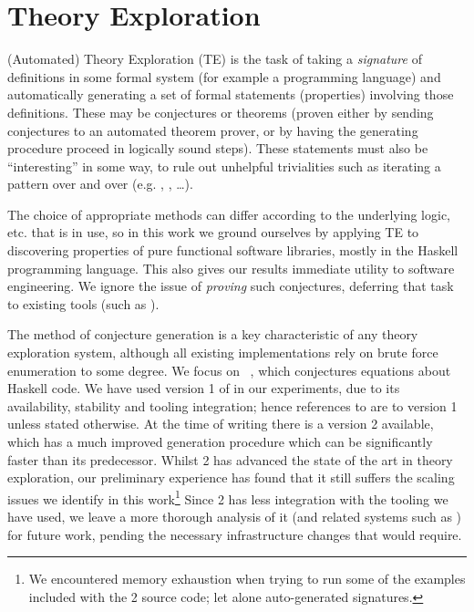 \section{Theory Exploration}
\label{sec:theoryexploration}

(Automated) Theory Exploration (TE) is the task of taking a \emph{signature}
of definitions in some formal system (for example a programming language) and
automatically generating a set of formal statements (properties) involving
those definitions. These may be conjectures or theorems (proven either by
sending conjectures to an automated theorem prover, or by having the generating
procedure proceed in logically sound steps). These statements must also be
``interesting'' in some way, to rule out unhelpful trivialities such as
iterating a pattern over and over (e.g. , ,
\dots).

\iffalse
It is beyond the scope of this paper
to define what makes a mathematical statement ``interesting'', but this problem
has been tackled extensively in the literature~\cite{colton2000notion}.
\fi

The choice of appropriate methods can differ according to the underlying logic,
etc. that is in use, so in this work we ground ourselves by applying TE to
discovering properties of pure functional software libraries, mostly in the
Haskell programming language. This also gives our results immediate utility to
software engineering. We ignore the issue of \emph{proving} such conjectures,
deferring that task to existing tools (such as \hipspec{}).

The method of conjecture generation is a key characteristic of any theory
exploration system, although all existing implementations rely on brute force
enumeration to some degree. We focus on \quickspec{}~\cite{QuickSpec}, which
conjectures equations about Haskell code. We have used version 1 of
\quickspec{} in our experiments, due to its availability, stability and tooling
integration; hence references to \quickspec{} are to version 1 unless stated
otherwise. At the time of writing there is a \quickspec{} version 2 available,
which has a much improved generation procedure which can be significantly faster
than its predecessor. Whilst \quickspec{} 2 has advanced the state of the art in
theory exploration, our preliminary experience has found that it still suffers
the scaling issues we identify in this work\footnote{We encountered memory
  exhaustion when trying to run some of the examples included with the
  \quickspec{} 2 source code; let alone auto-generated signatures.} Since
\quickspec{} 2 has less integration with the tooling we have used, we leave a
more thorough analysis of it (and related systems such as \speculate{}) for
future work, pending the necessary infrastructure changes that would require.

